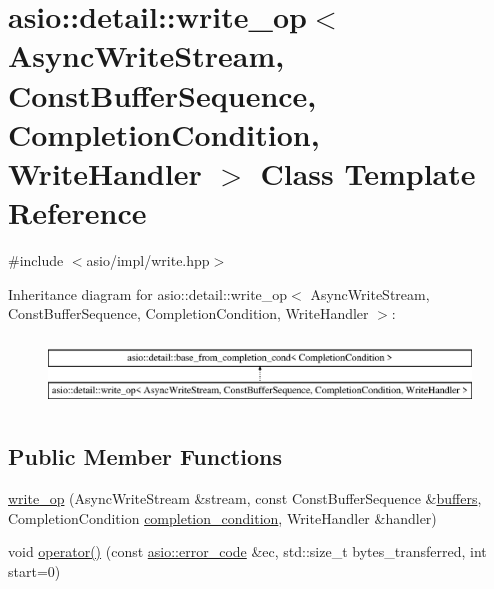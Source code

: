 \hypertarget{classasio_1_1detail_1_1write__op}{}\section{asio\+:\+:detail\+:\+:write\+\_\+op$<$ Async\+Write\+Stream, Const\+Buffer\+Sequence, Completion\+Condition, Write\+Handler $>$ Class Template Reference}
\label{classasio_1_1detail_1_1write__op}


{\ttfamily \#include $<$asio/impl/write.\+hpp$>$}

Inheritance diagram for asio\+:\+:detail\+:\+:write\+\_\+op$<$ Async\+Write\+Stream, Const\+Buffer\+Sequence, Completion\+Condition, Write\+Handler $>$\+:\begin{figure}[H]
\begin{center}
\leavevmode
\includegraphics[height=1.866667cm]{classasio_1_1detail_1_1write__op}
\end{center}
\end{figure}
\subsection*{Public Member Functions}
\begin{DoxyCompactItemize}
\item 
\hyperlink{classasio_1_1detail_1_1write__op_a9e643cf38742b07da4dba17ae3338de3}{write\+\_\+op} (Async\+Write\+Stream \&stream, const Const\+Buffer\+Sequence \&\hyperlink{group__async__read_ga54dede45c3175148a77fe6635222c47d}{buffers}, Completion\+Condition \hyperlink{group__async__read_gae2e215d5013596cc2b385bb6c13fa518}{completion\+\_\+condition}, Write\+Handler \&handler)
\item 
void \hyperlink{classasio_1_1detail_1_1write__op_a37ae71b86190227b9a290b7115fb4f3f}{operator()} (const \hyperlink{classasio_1_1error__code}{asio\+::error\+\_\+code} \&ec, std\+::size\+\_\+t bytes\+\_\+transferred, int start=0)
\end{DoxyCompactItemize}
